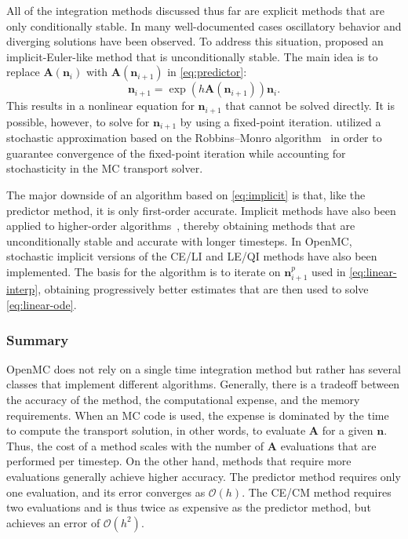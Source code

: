 \documentclass[3p,authoryear]{elsarticle}
\newcommand{\vect}[1]{\mathbf{#1}} %
\begin{document}
All of the integration methods discussed thus far are explicit methods that are
only conditionally stable. In many well-documented cases oscillatory behavior
and diverging solutions have been observed. To address this situation,
\citet{dufek2013ane} proposed an implicit-Euler-like method that is
unconditionally stable. The main idea is to replace $\vect{A}(\vect{n}_i)$ with
$\vect{A}(\vect{n}_{i+1})$ in \cref{eq:predictor}:
\begin{equation}
  \label{eq:implicit}
  \vect{n}_{i+1} = \exp \left( h\vect{A}(\vect{n}_{i+1}) \right) \vect{n}_i.
\end{equation}
This results in a nonlinear equation for $\vect{n}_{i+1}$ that cannot be solved
directly. It is possible, however, to solve for $\vect{n}_{i+1}$ by using a
fixed-point iteration. \citet{dufek2013ane} utilized a stochastic approximation
based on the Robbins--Monro algorithm~\citep{robbins1951ams} in order to
guarantee convergence of the fixed-point iteration while accounting for
stochasticity in the MC transport solver.

The major downside of an algorithm based on \cref{eq:implicit} is that, like the
predictor method, it is only first-order accurate. Implicit methods have also
been applied to higher-order
algorithms~\citep{kotlyar2014ane,kotlyar2016ane,cosgrove2020ane}, thereby
obtaining methods that are unconditionally stable and accurate with longer
timesteps. In OpenMC, stochastic implicit versions of the CE/LI and LE/QI
methods have also been implemented. The basis for the algorithm is to iterate on
$\vect{n}_{i+1}^p$ used in \cref{eq:linear-interp}, obtaining progressively
better estimates that are then used to solve \cref{eq:linear-ode}.

\subsubsection{Summary}

OpenMC does not rely on a single time integration method but rather has several
classes that implement different algorithms. Generally, there is a tradeoff
between the accuracy of the method, the computational expense, and the memory
requirements. When an MC code is used, the expense is dominated by the time to
compute the transport solution, in other words, to evaluate $\vect{A}$ for a
given $\vect{n}$. Thus, the cost of a method scales with the number of
$\vect{A}$ evaluations that are performed per timestep. On the other hand,
methods that require more evaluations generally achieve higher accuracy. The
predictor method requires only one evaluation, and its error converges as
$\mathcal{O}(h)$. The CE/CM method requires two evaluations and is thus twice as
expensive as the predictor method, but achieves an error of $\mathcal{O}(h^2)$.
\end{document}
